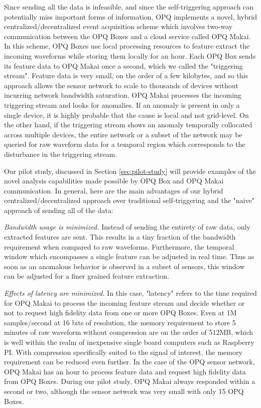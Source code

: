 Since sending all the data is infeasible, and since the self-triggering approach can potentially miss important forms of information, OPQ implements a novel, hybrid centralized/decentralized event acquisition scheme which involves two-way communication between the OPQ Boxes and a cloud service called OPQ Makai. In this scheme, OPQ Boxes use local processing resources to feature extract the incoming waveforms while storing them locally for an hour. Each OPQ Box sends its feature data to OPQ Makai once a second, which we called the "triggering stream". Feature data is very small, on the order of a few kilobytes, and so this approach allows the sensor network to scale to thousands of devices without incurring network bandwidth saturation.  OPQ Makai processes the incoming triggering stream and looks for anomalies. If an anomaly is present in only a single device, it is highly probable that the cause is local and not grid-level. On the other hand, if the triggering stream shows an anomaly temporally collocated across multiple devices, the entire network or a subset of the network may be queried for raw waveform data for a temporal region which corresponds to the disturbance in the triggering stream.

Our pilot study, discussed in Section \ref{sec:pilot-study} will provide examples of the novel analysis capabilities made possible by OPQ Box and OPQ Makai communication. In general, here are the main advantages of our hybrid centralized/decentralized approach over traditional self-triggering and the "naive" approach of sending all of the data:

{\em Bandwidth usage is minimized.} Instead of sending the entirety of raw data, only extracted features are sent. This results in a tiny fraction of the bandwidth requirement when compared to raw waveforms. Furthermore, the temporal window which encompasses a single feature can be adjusted in real time. Thus as soon as an anomalous behavior is observed in a subset of sensors, this window can be adjusted for a finer grained feature extraction.

{\em Effects of latency are minimized.} In this case, "latency" refers to the time required for OPQ Makai to process the incoming feature stream and decide whether or not to request high fidelity data from one or more OPQ Boxes. Even at 1M samples/second at 16 bits of resolution, the memory requirement to store 5 minutes of raw waveform without compression are on the order of 512MB, which is well within the realm of inexpensive single board computers such as Raspberry PI. With compression specifically suited to the signal of interest, the memory requirement can be reduced even further. In the case of the OPQ sensor network, OPQ Makai has an hour to process feature data and request high fidelity data from OPQ Boxes. During our pilot study, OPQ Makai always responded within a second or two, although the sensor network was very small with only 15 OPQ Boxes.

